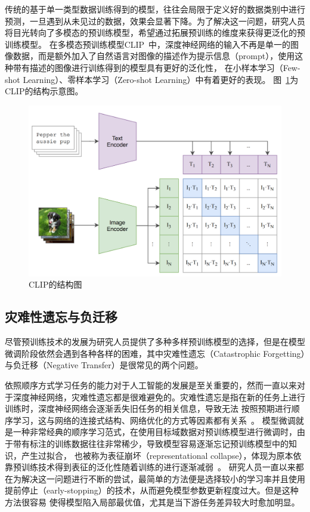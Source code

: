 传统的基于单一类型数据训练得到的模型，往往会局限于定义好的数据类别中进行预测，一旦遇到从未见过的数据，效果会显著下降。为了解决这一问题，研究人员将目光转向了多模态的预训练模型，希望通过拓展预训练的维度来获得更泛化的预训练模型。
在多模态预训练模型CLIP~\citep{radford2021learning}中，深度神经网络的输入不再是单一的图像数据，而是额外加入了自然语言对图像的描述作为提示信息（prompt），使用这种带有描述的图像进行训练得到的模型具有更好的泛化性，
在小样本学习（Few-shot Learning）、零样本学习（Zero-shot Learning）中有着更好的表现。
图~\ref{fig:clip}为CLIP的结构示意图。

\begin{figure}
    \centering
    \includegraphics[width=0.8\linewidth]{figures/clip.png}
    \caption{CLIP的结构图~\citep{radford2021learning}}
    \label{fig:clip}
\end{figure}

\subsection{灾难性遗忘与负迁移}

尽管预训练技术的发展为研究人员提供了多种多样预训练模型的选择，但是在模型微调阶段依然会遇到各种各样的困难，其中灾难性遗忘（Catastrophic Forgetting）与负迁移（Negative Transfer）是很常见的两个问题。

依照顺序方式学习任务的能力对于人工智能的发展是至关重要的，然而一直以来对于深度神经网络，灾难性遗忘都是很难避免的。灾难性遗忘是指在新的任务上进行训练时，深度神经网络会逐渐丢失旧任务的相关信息，导致无法
按照预期进行顺序学习，这与网络的连接式结构、网络优化的方式等因素都有关系~\citep{french1999catastrophic}。
模型微调就是一种非常经典的顺序学习范式，在使用目标域数据对预训练模型进行微调时，由于带有标注的训练数据往往非常稀少，导致模型容易逐渐忘记预训练模型中的知识，产生过拟合，
也被称为表征崩坏（representational collapse），体现为原本依靠预训练技术得到表征的泛化性随着训练的进行逐渐减弱~\citep{aghajanyan2020intrinsic}。
研究人员一直以来都在为解决这一问题进行不断的尝试，最简单的方法便是选择较小的学习率并且使用提前停止（early-stopping）的技术，从而避免模型参数更新程度过大。但是这种方法很容易
使得模型陷入局部最优值，尤其是当下游任务差异较大时愈加明显。

